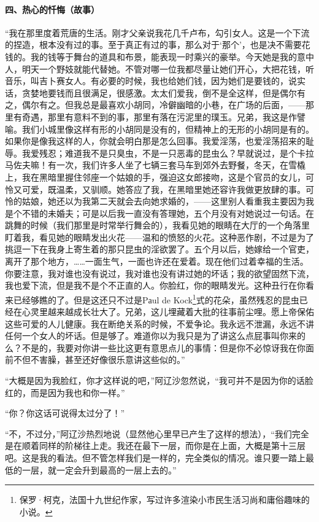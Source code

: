 \paragraph*{四、热心的忏悔（故事）}
\par “我在那里度着荒唐的生活。刚才父亲说我花几千卢布，勾引女人。这是一个下流的捏造，根本没有过的事。至于真正有过的事，那么对于‘那个’，也是决不需要花钱的。我的钱等于舞台的道具和布景，能表现一时乘兴的豪举。今天她是我的意中人，明天一个野妓就能代替她。不管对哪一位我都尽量让她们开心，大把花钱，听音乐，叫吉卜赛女人。有必要的时候，我也给她们钱，因为她们是要钱的，说实话，贪婪地要钱而且很满足，很感激。太太们爱我，倒不是全这样，但是偶尔有之，偶尔有之。但我总是最喜欢小胡同，冷僻幽暗的小巷，在广场的后面，——那里有奇遇，那里有意料不到的事，那里有落在污泥里的璞玉。兄弟，我这是作譬喻。我们小城里像这样有形的小胡同是没有的，但精神上的无形的小胡同是有的。如果你是像我这样的人，你就会明白那是怎么回事。我爱淫荡，也爱淫荡招来的耻辱。我爱残忍；难道我不是只臭虫，不是一只恶毒的昆虫么？早就说过，是个卡拉马佐夫嘛！有一次，我们许多人坐了七辆三套马车到郊外去野餐，冬天，在雪橇上，我在黑暗里握住邻座一个姑娘的手，强迫这女郎接吻，这是个官员的女儿，可怜又可爱，既温柔，又驯顺。她答应了我，在黑暗里她还容许我做更放肆的事。可怜的姑娘，她还以为我第二天就会去向她求婚的，——这里别人看重我主要因为我是个不错的未婚夫；可是以后我一直没有答理她，五个月没有对她说过一句话。在跳舞的时候（我们那里是时常举行舞会的），我看见她的眼睛在大厅的一个角落里盯着我，看见她的眼睛发出火花——温和的愤怒的火花。这种恶作剧，不过是为了挑逗一下在我身上寄生着的那只昆虫的淫欲罢了。五个月以后，她嫁给一个官吏，离开了那个地方，……一面生气，一面也许还在爱着。现在他们过着幸福的生活。你要注意，我对谁也没有说过，我对谁也没有讲过她的坏话；我的欲望固然下流，我也爱下流，但是我不是个不正直的人。你脸红，你的眼睛发光。这种丑行在你看来已经够瞧的了。但是这还只不过是Pаul de Kock\footnote{保罗·柯克，法国十九世纪作家，写过许多渲染小市民生活习尚和庸俗趣味的小说。}式的花朵，虽然残忍的昆虫已经在心灵里越来越成长壮大了。兄弟，这儿埋藏着大批的往事前尘哩。愿上帝保佑这些可爱的人儿健康。我在断绝关系的时候，不爱争论。我永远不泄漏，永远不讲任何一个女人的坏话。但是够了。难道你以为我只是为了讲这么点屁事叫你来的么？不是的，我要对你讲一些比这更有意思点儿的事情：但是你不必惊讶我在你面前不但不害臊，甚至还好像很乐意讲这些似的。”
\par “大概是因为我脸红，你才这样说的吧，”阿辽沙忽然说，“我可并不是因为你的话脸红的，而是因为我也和你一样。”
\par “你？你这话可说得太过分了！”
\par “不，不过分，”阿辽沙热烈地说（显然他心里早已产生了这样的想法），“我们完全是在顺着同样的阶梯往上走。我还在最下一层，而你是在上面，大概是第十三层吧。这是我的看法。但不管怎样我们是一样的，完全类似的情况。谁只要一踏上最低的一层，就一定会升到最高的一层上去的。”
